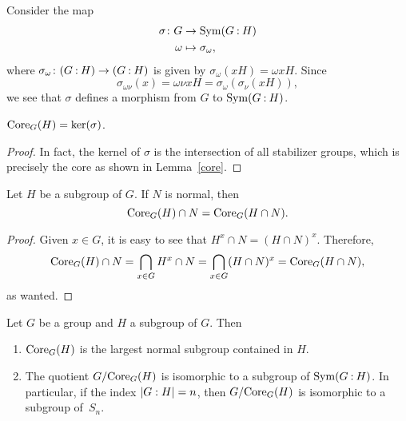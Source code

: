 \begin{rem}\label{G-to-Sym(X)}
    Consider the map
    \begin{align*}
        \sigma\colon G&\to{\rm Sym}(G\mathbin:H)\\
        \omega&\mapsto\sigma_{\omega},
    \end{align*}
    where $\sigma_\omega\colon (G\mathbin:H)\to(G\mathbin:H)$ is given by $\sigma_\omega(xH)=\omega xH$. Since
    $$
        \sigma_{\omega\nu}(x) = \omega\nu xH = \sigma_\omega(\sigma_\nu(xH)),
    $$
    we see that $\sigma$ defines a morphism from $G$ to ${\rm Sym}(G\mathbin:H)$.
\end{rem}


\begin{lem}\label{core=ker}
    ${\rm Core}_G(H)=\ker(\sigma)$.
\end{lem}

\begin{proof}     
    In fact, the kernel of $\sigma$ is the intersection of all stabilizer groups, which is precisely the core as shown in {\rm Lemma~\ref{core}}.  \end{proof}

\begin{prop}\label{core-cap-normal}
    Let\/ $H$ be a subgroup of\/ $G$. If\/ $N$ is normal, then
    $$
        {\rm Core}_G(H)\cap N= {\rm Core}_G(H\cap N).
    $$
\end{prop}

\begin{proof} Given $x\in G$, it is easy to see that $H^x\cap N=(H\cap N)^x$. Therefore,
$$
    {\rm Core}_G(H)\cap N = \bigcap_{x\in G}H^x\cap N = \bigcap_{x\in G}(H\cap N)^x
        ={\rm Core}_G(H\cap N),
$$
as wanted.  \end{proof}

\begin{thm}\label{largest-normal-subgroup}
    Let $G$ be a group and\/ $H$ a subgroup of\/ $G$. Then
    \begin{enumerate}[\rm a)]
        \item ${\rm Core}_G(H)$ is the largest normal subgroup contained in $H$.
        \item The quotient $G/{\rm Core}_G(H)$ is isomorphic to a subgroup of\/ ${\rm Sym}(G\mathbin:H)$. In particular, if the index $\left\vert{G:H}\right\vert=n$, then $G/{\rm Core}_G(H)$ is isomorphic to a subgroup of\/~$S_n$.
    \end{enumerate}
\end{thm}

